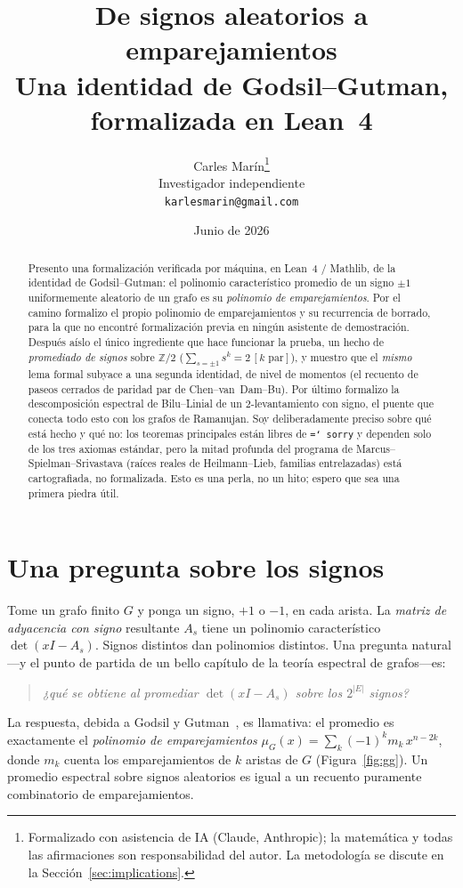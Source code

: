 \documentclass[11pt]{article}
\title{\bf De signos aleatorios a emparejamientos\\[3pt]
  \large\normalfont Una identidad de Godsil--Gutman, formalizada en Lean~4}
\author{Carles Mar\'in\thanks{Formalizado con asistencia de IA (Claude, Anthropic); la matemática y todas las afirmaciones son responsabilidad del autor. La metodología se discute en la Sección~\ref{sec:implications}.}\\[3pt]
  \normalsize Investigador independiente\\
  \normalsize \texttt{karlesmarin@gmail.com}}
\date{Junio de 2026}
\newcommand{\lean}[1]{\texttt{\hyphenchar\font=`\- #1}}
\newcommand{\Z}{\mathbb{Z}}
\begin{document}
\maketitle

\begin{abstract}
Presento una formalización verificada por máquina, en Lean~4 / Mathlib, de la
identidad de Godsil--Gutman: el polinomio característico promedio de un signo
$\pm1$ uniformemente aleatorio de un grafo es su \emph{polinomio de
emparejamientos}. Por el camino formalizo el propio polinomio de emparejamientos
y su recurrencia de borrado, para la que no encontré formalización previa en
ningún asistente de demostración. Después aíslo el único ingrediente que
hace funcionar la prueba, un hecho de \emph{promediado de signos} sobre $\Z/2$
($\sum_{s=\pm1}s^{k}=2\,[k\text{ par}]$), y muestro que el \emph{mismo} lema
formal subyace a una segunda identidad, de nivel de momentos (el recuento de
paseos cerrados de paridad par de Chen--van~Dam--Bu). Por último formalizo la
descomposición espectral de Bilu--Linial de un $2$-levantamiento con signo, el
puente que conecta todo esto con los grafos de Ramanujan.
Soy deliberadamente preciso sobre qué está hecho y qué no: los teoremas
principales están libres de \lean{sorry} y dependen solo de los tres axiomas
estándar, pero la mitad profunda del programa de Marcus--Spielman--Srivastava
(raíces reales de Heilmann--Lieb, familias entrelazadas) está cartografiada, no
formalizada. Esto es una perla, no un hito; espero que sea una primera piedra
útil.
\end{abstract}

\section{Una pregunta sobre los signos}
\label{sec:intro}

Tome un grafo finito $G$ y ponga un signo, $+1$ o $-1$, en cada arista. La
\emph{matriz de adyacencia con signo} resultante $A_s$ tiene un polinomio
característico $\det(xI-A_s)$. Signos distintos dan polinomios distintos. Una
pregunta natural---y el punto de partida de un bello capítulo de la teoría
espectral de grafos---es:
\begin{quote}\itshape
  ¿qué se obtiene al promediar $\det(xI-A_s)$ sobre los $2^{|E|}$ signos?
\end{quote}
La respuesta, debida a Godsil y Gutman~\cite{GodsilGutman1981}, es llamativa: el
promedio es exactamente el \emph{polinomio de emparejamientos}
$\mu_G(x)=\sum_k(-1)^k m_k\,x^{n-2k}$, donde $m_k$ cuenta los emparejamientos de
$k$ aristas de $G$ (Figura~\ref{fig:gg}). Un promedio espectral sobre signos
aleatorios es igual a un recuento puramente combinatorio de emparejamientos.
\end{document}
